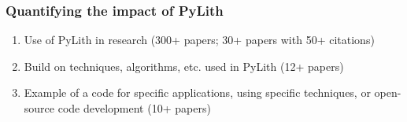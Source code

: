 \documentclass[aspectratio=169]{beamer}
\begin{document}
\begin{frame}[t]
  \frametitle{Quantifying the impact of PyLith}
  \summary{}


  \vfill
  \begin{enumerate}
  \item Use of PyLith in research (300+ papers; 30+ papers with 50+ citations)
  \item Build on techniques, algorithms, etc. used in PyLith (12+ papers)
  \item Example of a code for specific applications, using specific techniques, or open-source code development (10+ papers)
  \end{enumerate}
  
  \vfill

\end{frame}
\end{document}
